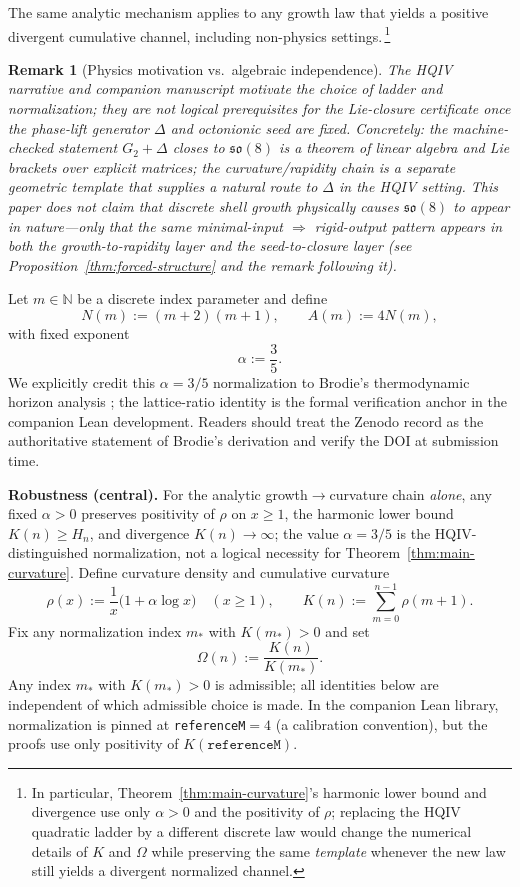 \documentclass[11pt]{amsart}
\newtheorem{remark}[theorem]{Remark}
\begin{document}
The same analytic mechanism applies to any growth law that yields a positive divergent cumulative channel, including non-physics settings.\,\footnote{In particular, Theorem~\ref{thm:main-curvature}'s harmonic lower bound and divergence use only \(\alpha>0\) and the positivity of \(\rho\); replacing the HQIV quadratic ladder by a different discrete law would change the numerical details of \(K\) and \(\Omega\) while preserving the same \emph{template} whenever the new law still yields a divergent normalized channel.}

\begin{remark}[Physics motivation vs.\ algebraic independence]
The HQIV narrative and companion manuscript motivate the \emph{choice} of ladder and normalization; they are not logical prerequisites for the Lie-closure certificate once the phase-lift generator \(\Delta\) and octonionic seed are fixed. Concretely: the machine-checked statement \(G_2+\Delta\) closes to \(\mathfrak{so}(8)\) is a theorem of linear algebra and Lie brackets over explicit matrices; the curvature/rapidity chain is a separate geometric template that supplies a natural route to \(\Delta\) in the HQIV setting. This paper does \emph{not} claim that discrete shell growth physically \emph{causes} \(\mathfrak{so}(8)\) to appear in nature---only that the same minimal-input \(\Rightarrow\) rigid-output pattern appears in both the growth-to-rapidity layer and the seed-to-closure layer (see Proposition~\ref{thm:forced-structure} and the remark following it).
\end{remark}

Let $m\in\mathbb N$ be a discrete index parameter and define
\[
N(m):=(m+2)(m+1),\qquad A(m):=4N(m),
\]
with fixed exponent
\[
\alpha:=\frac35.
\]
We explicitly credit this \(\alpha=3/5\) normalization to Brodie's thermodynamic horizon analysis \cite{brodie2026}; the lattice-ratio identity is the formal verification anchor in the companion Lean development.
Readers should treat the Zenodo record as the authoritative statement of Brodie's derivation and verify the DOI at submission time.

\medskip
\noindent\textbf{Robustness (central).} For the analytic growth\(\to\)curvature chain \emph{alone}, any fixed \(\alpha>0\) preserves positivity of \(\rho\) on \(x\ge 1\), the harmonic lower bound \(K(n)\ge H_n\), and divergence \(K(n)\to\infty\); the value \(\alpha=3/5\) is the HQIV-distinguished normalization, not a logical necessity for Theorem~\ref{thm:main-curvature}.
Define curvature density and cumulative curvature
\[
\rho(x):=\frac1x\bigl(1+\alpha\log x\bigr)\quad (x\ge 1),\qquad
K(n):=\sum_{m=0}^{n-1}\rho(m+1).
\]
Fix any normalization index $m_\ast$ with $K(m_\ast)>0$ and set
\[
\Omega(n):=\frac{K(n)}{K(m_\ast)}.
\]
Any index \(m_\ast\) with \(K(m_\ast)>0\) is admissible; all identities below are independent of which admissible choice is made. In the companion Lean library, normalization is pinned at \texttt{referenceM}\(=4\) (a calibration convention), but the proofs use only positivity of \(K(\texttt{referenceM})\).
\end{document}
